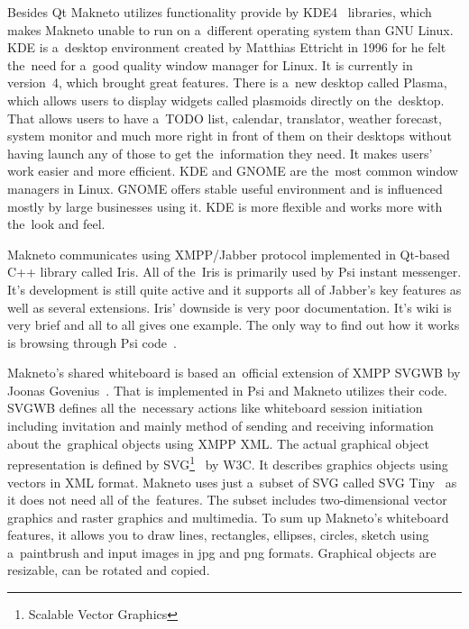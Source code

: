Besides Qt Makneto utilizes functionality provide by KDE4~\cite{KDE} libraries, which makes Makneto unable to run on a~different operating system than GNU Linux. KDE is a~desktop environment created by Matthias Ettricht in 1996 for he felt the~need for a~good quality window manager for Linux. It is currently in version~4, which brought great features. There is a~new desktop called Plasma, which allows users to display widgets called plasmoids directly on the~desktop. That allows users to have a~TODO list, calendar, translator, weather forecast, system monitor and much more right in front of them on their desktops without having launch any of those to get the~information they need. It makes users' work easier and more efficient. KDE and GNOME are the~most common window managers in Linux. GNOME offers stable useful environment and is influenced mostly by large businesses using it. KDE is more flexible and works more with the~look and feel.

Makneto communicates using XMPP/Jabber protocol implemented in Qt-based C++ library called Iris. All of the~Iris is primarily used by Psi instant messenger. It's development is still quite active and it supports all of Jabber's key features as well as several extensions. Iris' downside is very poor documentation. It's wiki is very brief and all to all gives one example. The only way to find out how it works is browsing through Psi code~\cite{irisWiki}.

Makneto's shared whiteboard is based an~official extension of XMPP SVGWB by Joonas Govenius~\cite{SVGWB}. That is implemented in Psi and Makneto utilizes their code. SVGWB defines all the~necessary actions like whiteboard session initiation including invitation and mainly method of sending and receiving information about the~graphical objects using XMPP XML. The actual graphical object representation is defined by SVG\footnote{Scalable Vector Graphics}~\cite{SVG} by W3C. It describes graphics objects using vectors in XML format. Makneto uses just a~subset of SVG called SVG Tiny~\cite{SVGtiny} as it does not need all of the~features. The subset includes two-dimensional vector graphics and raster graphics and multimedia. To sum up Makneto's whiteboard features, it allows you to draw lines, rectangles, ellipses, circles, sketch using a~paintbrush and input images in jpg and png formats. Graphical objects are resizable, can be rotated and copied.

